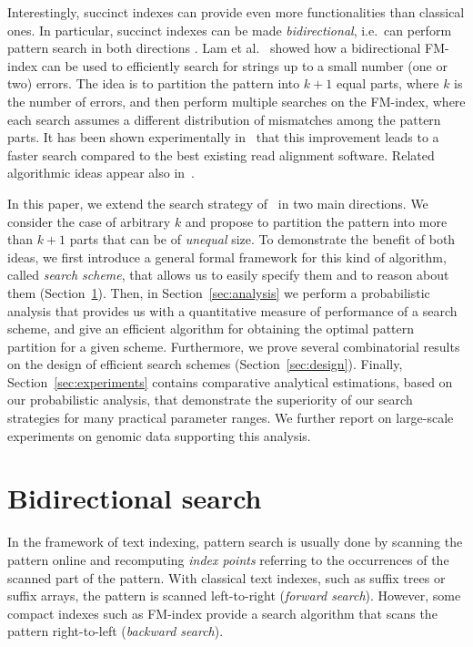 \documentclass[12pt]{article}
\begin{document}
Interestingly, succinct indexes can provide even more functionalities
than classical ones. In particular, succinct indexes can be
made \emph{bidirectional}, i.e.\ can perform pattern search in both
directions \cite{LamLTWWY09,RussoEtAlAlgorithms09,SchnattingerOG12,BelazzouguiCKM13}.
Lam et al.~\cite{LamLTWWY09} showed how a
bidirectional FM-index can be used to efficiently search for strings
up to a small number (one or two) errors. The idea is to partition the pattern into $k+1$
equal parts, where $k$ is the number of errors,
and then perform multiple searches on the FM-index, where
each search assumes a different distribution of mismatches among the
pattern parts. It has been shown experimentally
in~\cite{LamLTWWY09} that this improvement leads to a
faster search compared to the best existing read alignment
software.
Related algorithmic ideas appear also in~\cite{RussoEtAlAlgorithms09}.

In this paper, we extend the search strategy of~\cite{LamLTWWY09} 
in two
main directions. We consider the case of arbitrary $k$ and propose to
partition the pattern into more than $k+1$ parts that can be of
\emph{unequal} size. To demonstrate the benefit of both ideas, we first introduce a general formal framework for this
kind of algorithm, called \emph{search scheme}, that allows us to easily specify them and to
reason about them (Section~\ref{sec:bidirectional}). 
Then, in Section~\ref{sec:analysis} we perform a probabilistic analysis
that provides us with a quantitative measure of performance of a search
scheme, and give an efficient algorithm for obtaining the optimal
pattern partition for a given scheme.
Furthermore, we prove
several combinatorial results on the design of efficient search
schemes (Section~\ref{sec:design}).
Finally, Section~\ref{sec:experiments} contains comparative analytical
estimations, based on our probabilistic analysis, that demonstrate the
superiority of our search strategies for many practical parameter
ranges. 
We further report on large-scale experiments on genomic data
supporting this analysis. 

\section{Bidirectional search}\label{sec:bidirectional}

In the framework of text indexing, pattern search is usually done by
scanning the pattern online and recomputing \emph{index points}
referring to the occurrences of the scanned part of the pattern. 
With classical text indexes, such as suffix trees or
suffix arrays, the pattern is scanned left-to-right (\emph{forward
search}). However, some compact indexes such as FM-index provide a
search algorithm that scans the pattern right-to-left (\emph{backward
search}). 
\end{document}
